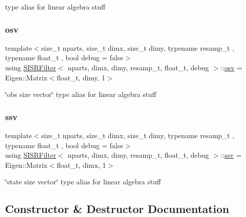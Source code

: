 type alias for linear algebra stuff \mbox{\label{classSISRFilter_a42325662bf3d057ccc3eaa75fa2f70f9}} 
\subsubsection{\texorpdfstring{osv}{osv}}
{\footnotesize\ttfamily template$<$size\+\_\+t nparts, size\+\_\+t dimx, size\+\_\+t dimy, typename resamp\+\_\+t , typename float\+\_\+t , bool debug = false$>$ \\
using \hyperlink{classSISRFilter}{S\+I\+S\+R\+Filter}$<$ nparts, dimx, dimy, resamp\+\_\+t, float\+\_\+t, debug $>$\+::\hyperlink{classSISRFilter_a42325662bf3d057ccc3eaa75fa2f70f9}{osv} =  Eigen\+::\+Matrix$<$float\+\_\+t, dimy, 1$>$}

\char`\"{}obs size vector\char`\"{} type alias for linear algebra stuff \mbox{\label{classSISRFilter_ada0fdfca451ed6a22a8bba48a881819d}} 
\subsubsection{\texorpdfstring{ssv}{ssv}}
{\footnotesize\ttfamily template$<$size\+\_\+t nparts, size\+\_\+t dimx, size\+\_\+t dimy, typename resamp\+\_\+t , typename float\+\_\+t , bool debug = false$>$ \\
using \hyperlink{classSISRFilter}{S\+I\+S\+R\+Filter}$<$ nparts, dimx, dimy, resamp\+\_\+t, float\+\_\+t, debug $>$\+::\hyperlink{classSISRFilter_ada0fdfca451ed6a22a8bba48a881819d}{ssv} =  Eigen\+::\+Matrix$<$float\+\_\+t, dimx, 1$>$}

\char`\"{}state size vector\char`\"{} type alias for linear algebra stuff 

\subsection{Constructor \& Destructor Documentation}
\mbox{\label{classSISRFilter_a3282cdeffd0f1e07e372212b330d7256}} 
